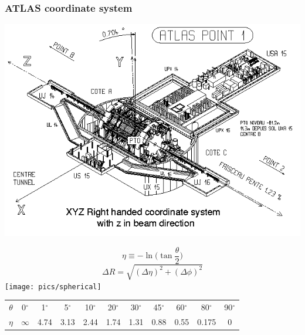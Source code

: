 
\begin{frame}\frametitle{ATLAS coordinate system}
\footnotesize\centering

\begin{minipage}{.65\textwidth}\centering
\includegraphics[width=.9\textwidth]{../detector/figures/coord.png}
\end{minipage}\begin{minipage}{.35\textwidth}\centering
$$\eta \equiv -\ln\bigg(\tan\frac{\theta}{2}\bigg)$$
$$\Delta R = \sqrt{(\Delta\eta)^{2} + (\Delta\phi)^{2}}$$
\texttt{[image: pics/spherical]}
\end{minipage}

\myskip
\begin{tabular}{ccccccccccc}\toprule
$\theta$ & 0$^{\circ}$ & 1$^{\circ}$ & 5$^{\circ}$ & 10$^{\circ}$ & 20$^{\circ}$ & 30$^{\circ}$ & 45$^{\circ}$ & 60$^{\circ}$ & 80$^{\circ}$ & 90$^{\circ}$ \\
$\eta$ & $\infty$ & 4.74 & 3.13 & 2.44 & 1.74 & 1.31 & 0.88 & 0.55 & 0.175 & 0\\\bottomrule \end{tabular}

\end{frame}


